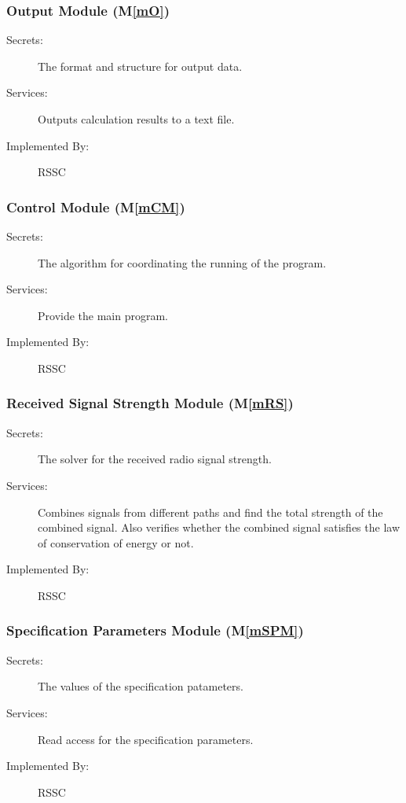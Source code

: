 \documentclass[12pt, titlepage]{article}
\newcommand{\mref}[1]{M\ref{#1}}
\begin{document}
\subsubsection{Output Module (\mref{mO})}

\begin{description}
\item[Secrets:]The format and structure for output data.
\item[Services:]Outputs calculation results to a text file.
\item[Implemented By:] RSSC
\end{description}

\subsubsection{Control Module (\mref{mCM})}

\begin{description}
\item[Secrets:]The algorithm for coordinating the running of the program.
\item[Services:]Provide the main program.
\item[Implemented By:] RSSC
\end{description}

\subsubsection{Received Signal Strength Module (\mref{mRS})}

\begin{description}
\item[Secrets:]The solver for the received radio signal strength.
\item[Services:]Combines signals from different paths and find the total strength of the combined signal. Also verifies whether the combined signal satisfies the law of conservation of energy or not.
\item[Implemented By:] RSSC
\end{description}

\subsubsection{Specification Parameters Module (\mref{mSPM})}

\begin{description}
\item[Secrets:]The values of the specification patameters.
\item[Services:]Read access for the specification parameters.
\item[Implemented By:] RSSC
\end{description}
\end{document}
